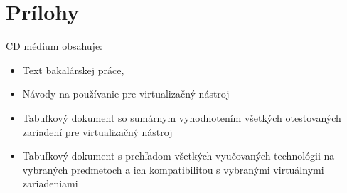 \chapter*{Prílohy}

CD médium obsahuje:

\begin{itemize}
    \item Text bakalárskej práce,
    \item Návody na používanie pre virtualizačný nástroj
    \item Tabuľkový dokument so sumárnym vyhodnotením všetkých otestovaných zariadení pre virtualizačný nástroj
    \item Tabuľkový dokument s prehľadom všetkých vyučovaných technológii na vybraných predmetoch a ich kompatibilitou s vybranými virtuálnymi zariadeniami
\end{itemize}